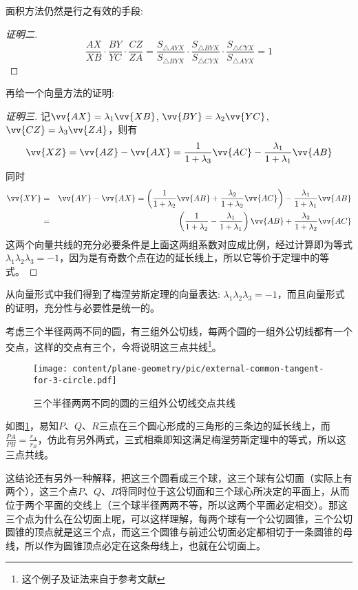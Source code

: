 面积方法仍然是行之有效的手段:
\begin{proof}[证明二]
  \begin{equation*}
    \frac{AX}{XB} \cdot \frac{BY}{YC} \cdot \frac{CZ}{ZA} =
    \frac{S_{\triangle AYX}}{S_{\triangle BYX}} \cdot
    \frac{S_{\triangle BYX}}{S_{\triangle CYX}} \cdot
    \frac{S_{\triangle CYX}}{S_{\triangle AYX}} = 1
  \end{equation*}
\end{proof}

再给一个向量方法的证明:
\begin{proof}[证明三]
  记$\vv{AX}=\lambda_1\vv{XB}$, $\vv{BY}=\lambda_2\vv{YC}$, $\vv{CZ}=\lambda_3\vv{ZA}$，则有
  \begin{equation*}
    \vv{XZ} = \vv{AZ}-\vv{AX}=\frac{1}{1+\lambda_3}\vv{AC}-\frac{\lambda_1}{1+\lambda_1}\vv{AB}
  \end{equation*}
  同时
  \begin{eqnarray*}
    \vv{XY} &=& \vv{AY} - \vv{AX} = \left( \frac{1}{1+\lambda_2}\vv{AB}+\frac{\lambda_2}{1+\lambda_2}\vv{AC} \right) - \frac{\lambda_1}{1+\lambda_1}\vv{AB} \\
    &=& \left( \frac{1}{1+\lambda_2}-\frac{\lambda_1}{1+\lambda_1} \right)\vv{AB}+\frac{\lambda_2}{1+\lambda_2}\vv{AC} 
  \end{eqnarray*}
这两个向量共线的充分必要条件是上面这两组系数对应成比例，经过计算即为等式$\lambda_1\lambda_2\lambda_3=-1$，因为是有奇数个点在边的延长线上，所以它等价于定理中的等式。
\end{proof}

从向量形式中我们得到了梅涅劳斯定理的向量表达: $\lambda_1\lambda_2\lambda_3=-1$，而且向量形式的证明，充分性与必要性是统一的。

\begin{example}
  \label{example:external-common-tangent-for-3-circle}
  考虑三个半径两两不同的圆，有三组外公切线，每两个圆的一组外公切线都有一个交点，这样的交点有三个，今将说明这三点共线\footnote{这个例子及证法来自于参考文献\cite{kuing-problem-book}}。
 
\begin{figure}[htbp]
\centering
\texttt{[image: content/plane-geometry/pic/external-common-tangent-for-3-circle.pdf]}
\caption{三个半径两两不同的圆的三组外公切线交点共线}
\label{fig:external-common-tangent-for-3-circle}
\end{figure}

如图\ref{fig:external-common-tangent-for-3-circle}，易知$P$、$Q$、$R$三点在三个圆心形成的三角形的三条边的延长线上，而$\frac{PA}{PB}=\frac{r_A}{r_B}$，仿此有另外两式，三式相乘即知这满足梅涅劳斯定理中的等式，所以这三点共线。

 这结论还有另外一种解释，把这三个圆看成三个球，这三个球有公切面（实际上有两个），这三个点$P$、$Q$、$R$将同时位于这公切面和三个球心所决定的平面上，从而位于两个平面的交线上（三个球半径两两不等，所以这两个平面必定相交）。那这三个点为什么在公切面上呢，可以这样理解，每两个球有一个公切圆锥，三个公切圆锥的顶点就是这三个点，而这三个圆锥与前述公切面必定都相切于一条圆锥的母线，所以作为圆锥顶点必定在这条母线上，也就在公切面上。
\end{example}

